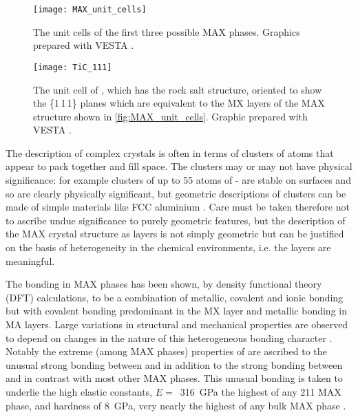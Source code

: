 \begin{figure}
\centering
\texttt{[image: MAX\_unit\_cells]}
\caption[The MAX phase unit cells.]{The unit cells of the first three possible MAX phases. Graphics prepared with VESTA \cite{Momma2011}.\label{fig:MAX_unit_cells}}
\end{figure}




\begin{figure}
\centering
{}
\texttt{[image: TiC\_111]}
\caption[The unit cell of .]{The unit cell of , which has the rock salt structure, oriented to show the \{1\,1\,1\} planes which are equivalent to the MX layers of the MAX structure shown in \autoref{fig:MAX_unit_cells}. Graphic prepared with VESTA \cite{Momma2011}.\label{fig:TiC_111}}
\end{figure}


The description of complex crystals is often in terms of clusters of atoms that appear to pack together and fill space. The clusters may or may not have physical significance: for example clusters of up to 55 atoms of - are stable on surfaces and so are clearly physically significant, but geometric descriptions of clusters can be made of simple materials like FCC aluminium \cite{Steurer2006}. Care must be taken therefore not to ascribe undue significance to purely geometric features, but the description of the MAX crystal structure as layers is not simply geometric but can be justified on the basis of heterogeneity in the chemical environments, i.e. the layers are meaningful.

The bonding in MAX phases has been shown, by density functional theory (DFT) calculations, to be a combination of metallic, covalent and ionic bonding but with covalent bonding predominant in the MX layer and metallic bonding in MA layers. Large variations in structural and mechanical properties are observed to depend on changes in the nature of this heterogeneous bonding character \cite{Radovic2013,Sun2011}. Notably the extreme (among MAX phases) properties of  are ascribed to the unusual strong bonding between  and  in addition to the strong bonding between  and  in contrast with most other MAX phases. This unusual bonding is taken to underlie the high elastic constants, $E =$~\SI{316}{\giga\pascal} the highest of any 211 MAX phase, and hardness of \SI{8}{\giga\pascal}, very nearly the highest of any bulk MAX phase \cite{Feng2010,Sun2011}.

